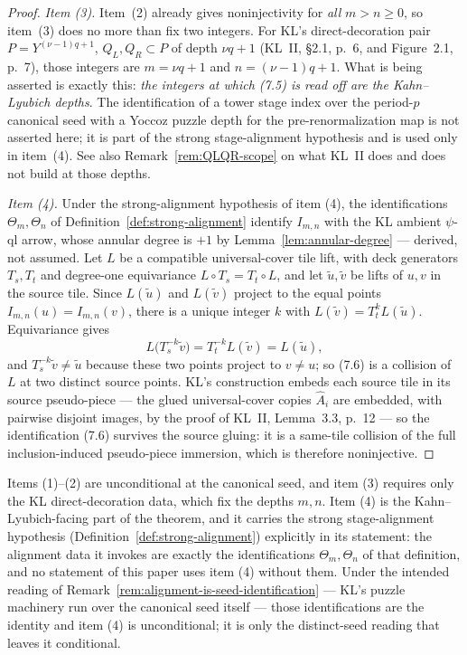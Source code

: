 \begin{proof}
\emph{Item (3).}  Item~(2) already gives noninjectivity for \emph{all} \(m>n\ge0\), so item~(3) does no more than fix two integers.  For KL's direct-decoration pair \(P=Y^{(\nu-1)q+1}\), \(Q_L,Q_R\subset P\) of depth \(\nu q+1\) (KL~II, \S2.1, p.~6, and Figure~2.1, p.~7), those integers are \(m=\nu q+1\) and \(n=(\nu-1)q+1\).  What is being asserted is exactly this: \emph{the integers at which (7.5) is read off are the Kahn--Lyubich depths}.  The identification of a tower stage index over the period-\(p\) canonical seed with a Yoccoz puzzle depth for the pre-renormalization map is not asserted here; it is part of the strong stage-alignment hypothesis and is used only in item~(4).  See also Remark~\ref{rem:QLQR-scope} on what KL~II does and does not build at those depths.

\emph{Item (4).}  Under the strong-alignment hypothesis of item (4), the identifications \(\Theta_m,\Theta_n\) of Definition~\ref{def:strong-alignment} identify \(I_{m,n}\) with the KL ambient \(\psi\)-ql arrow, whose annular degree is \(+1\) by Lemma~\ref{lem:annular-degree} --- derived, not assumed.  Let \(L\) be a compatible universal-cover tile lift, with deck generators \(T_s,T_t\) and degree-one equivariance \(L\circ T_s=T_t\circ L\), and let \(\widetilde u,\widetilde v\) be lifts of \(u,v\) in the source tile.  Since \(L(\widetilde u)\) and \(L(\widetilde v)\) project to the equal points \(I_{m,n}(u)=I_{m,n}(v)\), there is a unique integer \(k\) with \(L(\widetilde v)=T_t^kL(\widetilde u)\).  Equivariance gives
\[
 L\bigl(T_s^{-k}\widetilde v\bigr)=T_t^{-k}L(\widetilde v)=L(\widetilde u),  \tag{7.6}
\]
and \(T_s^{-k}\widetilde v\ne\widetilde u\) because these two points project to \(v\ne u\); so (7.6) is a collision of \(L\) at two distinct source points.  KL's construction embeds each source tile in its source pseudo-piece --- the glued universal-cover copies \(\widehat A_i\) are embedded, with pairwise disjoint images, by the proof of KL~II, Lemma~3.3, p.~12 --- so the identification (7.6) survives the source gluing: it is a same-tile collision of the full inclusion-induced pseudo-piece immersion, which is therefore noninjective.
\end{proof}

\begin{remark}
\label{rem:propagation-alignment}
Items (1)--(2) are unconditional at the canonical seed, and item (3)
requires only the KL direct-decoration data, which fix the depths
\(m,n\).  Item (4) is the Kahn--Lyubich-facing part of the theorem,
and it carries the strong stage-alignment hypothesis
(Definition~\ref{def:strong-alignment}) explicitly in its statement:
the alignment data it invokes are exactly the identifications
\(\Theta_m,\Theta_n\) of that definition, and no statement of this
paper uses item (4) without them.  Under the intended reading of
Remark~\ref{rem:alignment-is-seed-identification} --- KL's puzzle
machinery run over the canonical seed itself --- those identifications
are the identity and item (4) is unconditional; it is only the
distinct-seed reading that leaves it conditional.
\end{remark}
